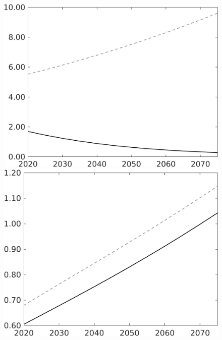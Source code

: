 \documentclass[12pt]{article}
\begin{document}
\begin{figure}[h!!]
\begin{minipage}[]{0.32\textwidth}
	\end{minipage}	
	\begin{minipage}[]{0.32\textwidth}
		\includegraphics[width=1\textwidth]{../../codding_model/own_basedOnFried/optimalPol_010922_revision/figures/all_13Sept22/LevTaufNoTauf_TaulCalib_Equlab_regime0_pgpftf_spillover0_nsk0_xgr0_knspil1_sep1_LFlimit0_emsbase0_countec0_GovRev0_etaa0.79_lgd0.png}
	\end{minipage}
	\begin{minipage}[]{0.32\textwidth}
		\includegraphics[width=1\textwidth]{../../codding_model/own_basedOnFried/optimalPol_010922_revision/figures/all_13Sept22/LevTaufNoTauf_TaulCalib_Equlab_regime0_E_spillover0_nsk0_xgr0_knspil1_sep1_LFlimit0_emsbase0_countec0_GovRev0_etaa0.79_lgd0.png}

\end{minipage}
\end{figure}
\end{document}
